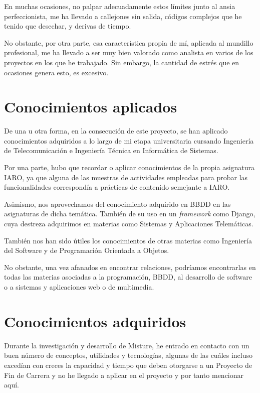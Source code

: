 En muchas ocasiones, no palpar adecuadamente estos límites junto al ansia perfeccionista, me ha llevado a callejones sin salida, códigos complejos que he tenido que desechar, y derivas de tiempo.


No obstante, por otra parte, esa característica propia de mí, aplicada al mundillo profesional, me ha llevado a ser muy bien valorado como analista en varios de los proyectos en los que he trabajado. Sin embargo, la cantidad de estrés que en ocasiones genera esto, es excesivo.

\newpage
\section{Conocimientos aplicados}

De una u otra forma, en la consecución de este proyecto, se han aplicado conocimientos adquiridos a lo largo de mi etapa universitaria cursando Ingeniería de Telecomunicación e Ingeniería Técnica en Informática de Sistemas.


Por una parte, hubo que recordar o aplicar conocimientos de la propia asignatura IARO, ya que alguna de las muestras de actividades empleadas para probar las funcionalidades correspondía a prácticas de contenido semejante a IARO.


Asimismo, nos aprovechamos del conocimiento adquirido en BBDD en las asignaturas de dicha temática. También de su uso en un \textit{framework} como Django, cuya destreza adquirimos en materias como Sistemas y Aplicaciones Telemáticas.


También nos han sido útiles los conocimientos de otras materias como Ingeniería del Software y de Programación Orientada a Objetos.


No obstante, una vez afanados en encontrar relaciones, podríamos encontrarlas en todas las materias asociadas a la programación, BBDD, al desarrollo de software o a sistemas y aplicaciones web o de multimedia.

\newpage
\section{Conocimientos adquiridos}


Durante la investigación y desarrollo de Misture, he entrado en contacto con un buen número de conceptos, utilidades y tecnologías, algunas de las cuáles incluso excedían con creces la capacidad y tiempo que deben otorgarse a un Proyecto de Fin de Carrera y no he llegado a aplicar en el proyecto y por tanto mencionar aquí.


